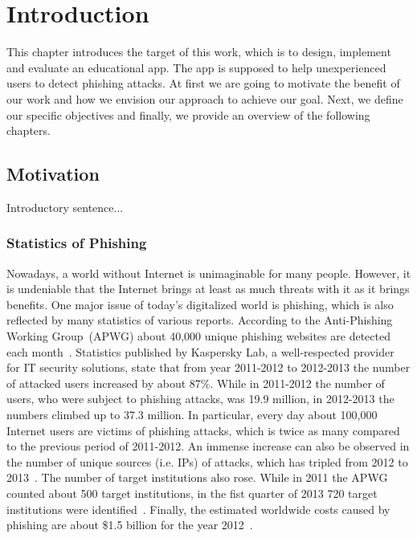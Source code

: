 \section{Introduction}
\label{s:introduction}
This chapter introduces the target of this work, which is to design, implement and evaluate an educational app. The app is supposed to help unexperienced users to detect phishing attacks. At first we are going to motivate the benefit of our work and how we envision our approach to achieve our goal. Next, we define our specific objectives and finally, we provide an overview of the following chapters.



\subsection{Motivation}
Introductory sentence...

\subsubsection{Statistics of Phishing}
Nowadays, a world without Internet is unimaginable for many people. However, it is undeniable that the Internet brings at least as much threats with it as it brings benefits. One major issue of today's digitalized world is phishing, which is also reflected by many statistics of various reports. According to the Anti-Phishing Working Group~(APWG) about 40,000 unique phishing websites are detected each month~\cite{antiphishingtrendreport2013}. Statistics published by Kaspersky Lab, a well-respected provider for IT security solutions, state that from year 2011-2012 to 2012-2013 the number of attacked users increased by about 87\%. While in 2011-2012 the number of users, who were subject to phishing attacks, was 19.9 million, in 2012-2013 the numbers climbed up to 37.3 million. In particular, every day about 100,000 Internet users are victims of phishing attacks, which is twice as many compared to the previous period of 2011-2012. An immense increase can also be observed in the number of unique sources (i.e. IPs) of attacks, which has tripled from 2012 to 2013~\cite{kasperskyreport2013}. The number of target institutions also rose. While in 2011 the APWG counted about 500 target institutions, in the fist quarter of 2013 720 target institutions were identified~\cite{antiphishingglobalreport2013}. Finally, the estimated worldwide costs caused by phishing are about \$1.5 billion for the year 2012~\cite{rsa2013}.


